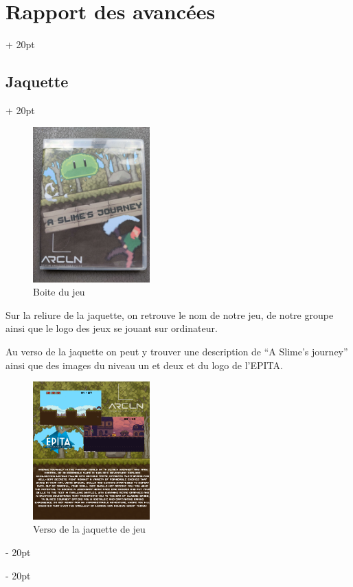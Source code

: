 \documentclass[a4paper, 12pt, twoside]{article}
\newcommand{\ind}[1][20pt]{\advance\leftskip + #1}
\newcommand{\deind}[1][20pt]{\advance\leftskip - #1}
\newenvironment{indt}[2][20pt]{#2 \par \ind[#1]}{\par \deind} %
\begin{document}
\begin{indt}{\section{Rapport des avancées}}
\begin{indt}{\subsection{Jaquette}}
            \begin{figure}[h]
                \centering
                \includegraphics[width=0.4\textwidth]{Box.jpg}
                \caption{Boite du jeu}
                \label{fig:mesh1}
            \end{figure}

            Sur la reliure de la jaquette, on retrouve le nom de notre jeu, de notre groupe ainsi que le logo des jeux se jouant sur ordinateur.

            Au verso de la jaquette on peut y trouver une description de “A Slime’s journey” ainsi que des images du niveau un et deux et du logo de l’EPITA.

            \begin{figure}[h]
                \centering
                \includegraphics[width=0.4\textwidth]{Jaquette3.png}
                \caption{Verso de la jaquette de jeu}
                \label{fig:mesh1}
            \end{figure}
        \end{indt}

        \newpage


\end{indt}
\end{document}
